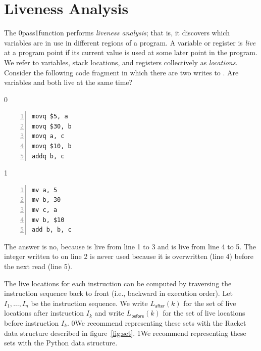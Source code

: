 \documentclass[7x10]{TimesAPriori_MIT}%
\def\racketEd{0}
\def\pythonEd{1}
\def\edition{1}
\def\xeightysixEd{0}
\def\riscvEd{1}
\def\architecture{1}
\newcommand{\racket}[1]{{\if\edition\racketEd{#1}\fi}}
\newcommand{\pythonColor}[0]{}
\newcommand{\python}[1]{{\if\edition\pythonEd\pythonColor #1\fi}}
\numberwithin{theorem}{chapter}
\numberwithin{definition}{chapter}
\numberwithin{equation}{chapter}
\begin{document}

\section{Liveness Analysis}
\label{sec:liveness-analysis-Lvar}

The  \racket{pass}\python{function} performs
\emph{liveness analysis}; that is, it discovers which variables are
in use in different regions of a program.
%
A variable or register is \emph{live} at a program point if its
current value is used at some later point in the program.  We refer to
variables, stack locations, and registers collectively as
\emph{locations}.
%
Consider the following code fragment in which there are two writes to
. Are variables  and  both live at the same
time?
\begin{center}
  \begin{minipage}{0.85\textwidth}
\if\architecture\xeightysixEd
\begin{lstlisting}[numbers=left,numberstyle=\tiny]
movq $5, a
movq $30, b
movq a, c
movq $10, b
addq b, c
\end{lstlisting}
\fi
\if\architecture\riscvEd
\begin{lstlisting}[numbers=left,numberstyle=\tiny]
mv a, 5
mv b, 30
mv c, a
mv b, $10
add b, b, c
\end{lstlisting}
\fi
\end{minipage}
\end{center}
The answer is no, because  is live from line 1 to 3 and
 is live from line 4 to 5.  The integer written to  on
line 2 is never used because it is overwritten (line 4) before the
next read (line 5).

The live locations for each instruction can be computed by traversing
the instruction sequence back to front (i.e., backward in execution
order).  Let $I_1,\ldots, I_n$ be the instruction sequence. We write
$L_{\mathsf{after}}(k)$ for the set of live locations after
instruction $I_k$ and write $L_{\mathsf{before}}(k)$ for the set of live
locations before instruction $I_k$.  \racket{We recommend representing
  these sets with the Racket  data structure described in
  figure~\ref{fig:set}.}  \python{We recommend representing these sets
  with the Python
  \href{https://docs.python.org/3.10/library/stdtypes.html\#set-types-set-frozenset}{\code{set}}
  data structure.}
\end{document}
